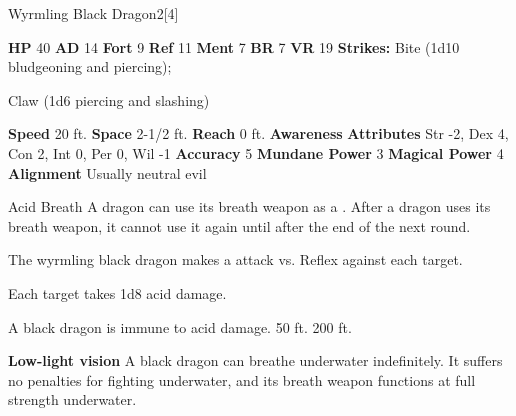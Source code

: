       
  \begin{monsubsection}{Wyrmling Black Dragon}{2}[4]
    \vspace{-1em}\vspace{-1em}
    \vspace{0em}

    
    

    \begin{spellcontent}
      \begin{spelltargetinginfo}
        \pari \textbf{HP} 40 \monsep
          \textbf{AD} 14 \monsep
          \textbf{Fort} 9 \monsep
          \textbf{Ref} 11 \monsep
          \textbf{Ment} 7
        \pari \textbf{BR} 7 \monsep
        \textbf{VR} 19
        \pari \textbf{Strikes:}
            Bite  (1d10 bludgeoning and piercing);
\par Claw  (1d6 piercing and slashing)
      \end{spelltargetinginfo}
    \end{spellcontent}
    \begin{monsterfooter}
      \pari \textbf{Speed} 20 ft. \monsep
        \textbf{Space} 2-1/2 ft. \monsep
        \textbf{Reach} 0 ft.
      \pari \textbf{Awareness} 
      \pari \textbf{Attributes}
        Str -2, Dex 4,
        Con 2, Int 0,
        Per 0, Wil -1
      \pari \textbf{Accuracy} 5 \monsep
        \textbf{Mundane Power} 3 \monsep
      \textbf{Magical Power} 4
      \pari \textbf{Alignment} Usually neutral evil
    \end{monsterfooter}
  \end{monsubsection}
  \begin{freeability}{Acid Breath}
      A dragon can use its breath weapon as a .
      After a dragon uses its breath weapon, it cannot use it again until after the end of the next round.
      \par The wyrmling black dragon makes a  attack
        vs. Reflex against each target.
    
    \hit Each target takes 1d8 acid damage.
    \end{freeability}
  
      
       A black dragon is immune to acid damage.
     50 ft.
     200 ft.
    \par\noindent\textbf{Low-light vision}
        A black dragon can breathe underwater indefinitely.
        It suffers no penalties for fighting underwater, and its breath weapon functions at full strength underwater.
  

